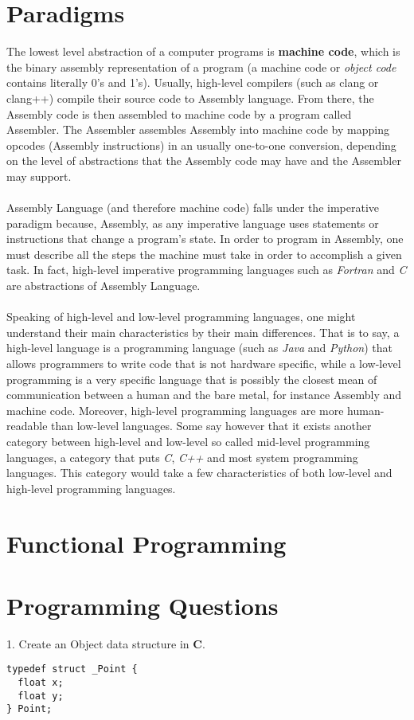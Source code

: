 \documentclass[conference]{IEEEtran}
\begin{document}
\section{Paradigms}
The lowest level abstraction of a computer programs is \textbf{machine code}, which is the binary assembly representation of a program (a machine code or \textit{object code} contains literally 0's and 1's). Usually, high-level compilers (such as clang or clang++) compile their source code to Assembly language. From there, the Assembly code is then assembled to machine code by a program called Assembler. The Assembler assembles Assembly into machine code by mapping opcodes (Assembly instructions) in an usually one-to-one conversion, depending on the level of abstractions that the Assembly code may have and the Assembler may support.
\\\\
Assembly Language (and therefore machine code) falls under the imperative paradigm because, Assembly, as any imperative language uses statements or instructions that change a program's state. In order to program in Assembly, one must describe all the steps the machine must take in order to accomplish a given task. In fact, high-level imperative programming languages such as \textit{Fortran} and \textit{C} are abstractions of Assembly Language.
\\\\
Speaking of high-level and low-level programming languages, one might understand their main characteristics by their main differences. That is to say, a high-level language is a programming language (such as \textit{Java} and \textit{Python}) that allows programmers to write code that is not hardware specific, while a low-level programming is a very specific language that is possibly the closest mean of communication between a human and the bare metal, for instance Assembly and machine code. Moreover, high-level programming languages are more human-readable than low-level languages. Some say however that it exists another category between high-level and low-level so called mid-level programming languages, a category that puts \textit{C}, \textit{C++} and most system programming languages. This category would take a few characteristics of both low-level and high-level programming languages. 
\section{Functional Programming}
\section{Programming Questions}
1. Create an Object data structure in \textbf{C}.
\lstset{language=c}
\begin{lstlisting}[frame=single]
typedef struct _Point {
  float x;
  float y;
} Point;
\end{lstlisting}
\end{document}
